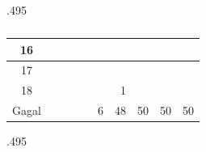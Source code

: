 \begin{table}
\begin{subtable}{.495\linewidth}
{\begin{tabular}{|c|lllllllll|}
			16                                                                             & \multicolumn{1}{r|}{}   & \multicolumn{1}{r|}{}   & \multicolumn{1}{r|}{}   & \multicolumn{1}{r|}{}   & \multicolumn{1}{r|}{}   & \multicolumn{1}{r|}{}   & \multicolumn{1}{r|}{}   & \multicolumn{1}{r|}{}   &                         \\ \hline
			17                                                                             & \multicolumn{1}{r|}{}   & \multicolumn{1}{r|}{}   & \multicolumn{1}{r|}{}   & \multicolumn{1}{r|}{}   & \multicolumn{1}{r|}{}   & \multicolumn{1}{r|}{}   & \multicolumn{1}{r|}{}   & \multicolumn{1}{r|}{}   &                         \\ \hline
			18                                                                             & \multicolumn{1}{r|}{}   & \multicolumn{1}{r|}{}   & \multicolumn{1}{r|}{}   & \multicolumn{1}{r|}{}   & \multicolumn{1}{r|}{}   & \multicolumn{1}{r|}{1}  & \multicolumn{1}{r|}{}   & \multicolumn{1}{r|}{}   &                         \\ \hline
			Gagal                                                                          & \multicolumn{1}{r|}{}   & \multicolumn{1}{r|}{}   & \multicolumn{1}{r|}{}   & \multicolumn{1}{r|}{}   & \multicolumn{1}{r|}{6}  & \multicolumn{1}{r|}{48} & \multicolumn{1}{r|}{50} & \multicolumn{1}{r|}{50} & 50                      \\ \hline
			\end{tabular}
		}
	\end{subtable}
	\begin{subtable}{.495\linewidth}
		\centering
		\caption{}
\end{subtable}
\end{table}
